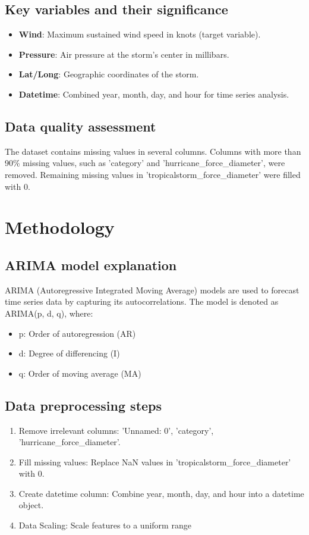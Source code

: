 \documentclass{article}
\begin{document}
	\subsection{Key variables and their significance}
	\begin{itemize}
		\item \textbf{Wind}: Maximum sustained wind speed in knots (target variable).
		\item \textbf{Pressure}: Air pressure at the storm's center in millibars.
		\item \textbf{Lat/Long}: Geographic coordinates of the storm.
		\item \textbf{Datetime}: Combined year, month, day, and hour for time series analysis.
	\end{itemize}
	
	\subsection{Data quality assessment}
	The dataset contains missing values in several columns. Columns with more than 90\% missing values, such as 'category' and 'hurricane\_force\_diameter', were removed. Remaining missing values in 'tropicalstorm\_force\_diameter' were filled with 0.
	
	\section{Methodology}
	\subsection{ARIMA model explanation}
	ARIMA (Autoregressive Integrated Moving Average) models are used to forecast time series data by capturing its autocorrelations. The model is denoted as ARIMA(p, d, q), where:
	\begin{itemize}
		\item p: Order of autoregression (AR)
		\item d: Degree of differencing (I)
		\item q: Order of moving average (MA)
	\end{itemize}
	
	\subsection{Data preprocessing steps}
	\begin{enumerate}
		\item Remove irrelevant columns: 'Unnamed: 0', 'category', 'hurricane\_force\_diameter'.
		\item Fill missing values: Replace NaN values in 'tropicalstorm\_force\_diameter' with 0.
		\item Create datetime column: Combine year, month, day, and hour into a datetime object.
		\item Data Scaling: Scale features to a uniform range
	\end{enumerate}
	
\end{document}

